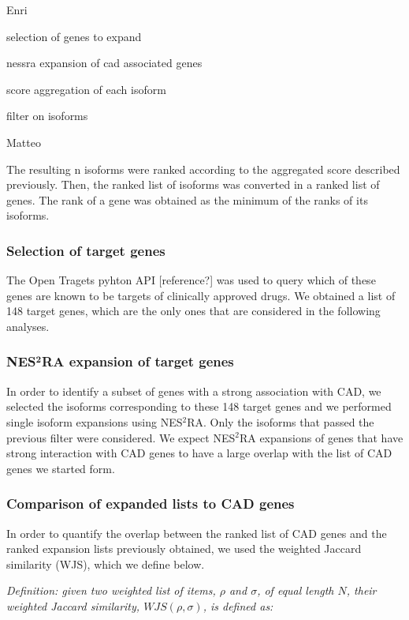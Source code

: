 \documentclass[fleqn,10pt]{SelfArx} %
\begin{document}
Enri

selection of genes to expand

nessra expansion of cad associated genes

score aggregation of each isoform

filter on isoforms

Matteo

The resulting n isoforms were ranked according to the aggregated score described previously. Then, the ranked list of isoforms was converted in a ranked list of genes. The rank of a gene was obtained as the minimum of the ranks of its isoforms.

\subsubsection{Selection of target genes}

The Open Tragets pyhton API [reference?] was used to query which of these genes are known to be targets of clinically approved drugs. We obtained a list of 148 target genes, which are the only ones that are considered in the following analyses.

\subsubsection{NES$^{\textbf{2}}$RA expansion of target genes}

In order to identify a subset of genes with a strong association with CAD, we selected the isoforms corresponding to these 148 target genes and we performed single isoform expansions using NES$^2$RA. Only the isoforms that passed the previous filter were considered. We expect NES$^2$RA expansions of genes that have strong interaction with CAD genes to have a large overlap with the list of CAD genes we started form.

\subsubsection{Comparison of expanded lists to CAD genes}

In order to quantify the overlap between the ranked list of CAD genes and the ranked expansion lists previously obtained, we used the weighted Jaccard similarity (WJS), which we define below.\medskip

\noindent
\textit{Definition: given two weighted list of items, $\rho$ and $\sigma$, of equal length $N$, their weighted Jaccard similarity, $WJS(\rho, \sigma)$, is defined as:}
\end{document}
